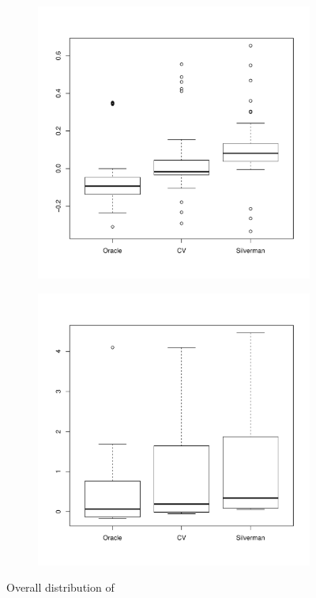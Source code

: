 \begin{figure}[htbp]
    \centering
    \begin{subfigure}[t]{0.45\textwidth}
        \includegraphics[width=\textwidth]{results/by_overall/relative-peak-bias-boxplot}
        \label{fig:discussion:overall_peakbias_boxplot:unif}
    \end{subfigure}
    \begin{subfigure}[t]{0.45\textwidth}
        \includegraphics[width=\textwidth]{results/by_overall/relative-peak-bias-peakpop-boxplot}
        \label{fig:discussion:overall_peakbias_boxplot:peak}
    \end{subfigure}
    \caption{Overall distribution of }
    \label{fig:discussion:overall_peakbias_boxplot}
\end{figure}

